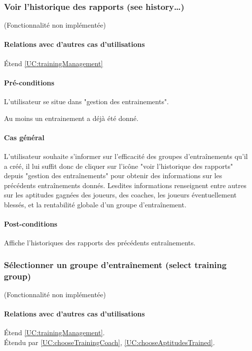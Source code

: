 \subsubsection{Voir l'historique des rapports (see history…)}
\label{UC:TrainingHistory}
(Fonctionnalité non implémentée)
\paragraph{Relations avec d'autres cas d'utilisations}
Étend \ref{UC:trainingManagement}
\paragraph{Pré-conditions}
\begin{list}{}{\leftmargin=1.5em}
\item{L'utilisateur se situe dans "gestion des entrainements".}
\item{Au moins un entrainement a déjà été donné.}
\end{list}
\paragraph{Cas général}
L'utilisateur souhaite s'informer sur l'efficacité des groupes d'entraînements qu'il a créé, il lui suffit donc de cliquer sur l'icône "voir l'historique des rapports" depuis "gestion des entraînements" pour obtenir des informations sur les précédents entraînements donnés. Lesdites informations renseignent entre autres sur les aptitudes gagnées des joueurs, des coaches, les joueurs éventuellement blessés, et la rentabilité globale d'un groupe d'entraînement. 
\paragraph{Post-conditions}
\begin{list}{}{\leftmargin=1.5em}
\item{Affiche l'historiques des rapports des précédents entraînements.}
\end{list}

\subsubsection{Sélectionner un groupe d'entraînement (select training group)}
\label{UC:selectTrainingGroup}
(Fonctionnalité non implémentée)
\paragraph{Relations avec d'autres cas d'utilisations}
Étend \ref{UC:trainingManagement}.\\
Étendu par \ref{UC:chooseTrainingCoach}, \ref{UC:chooseAptitudesTrained}.
